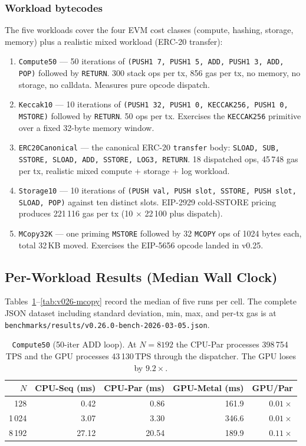 \subsubsection*{Workload bytecodes}

The five workloads cover the four EVM cost classes (compute, hashing,
storage, memory) plus a realistic mixed workload (ERC-20 transfer):

\begin{enumerate}
  \item \texttt{Compute50} --- 50 iterations of
    \texttt{(PUSH1 7, PUSH1 5, ADD, PUSH1 3, ADD, POP)} followed by
    \texttt{RETURN}. 300 stack ops per tx, 856 gas per tx, no memory,
    no storage, no calldata. Measures pure opcode dispatch.
  \item \texttt{Keccak10} --- 10 iterations of
    \texttt{(PUSH1 32, PUSH1 0, KECCAK256, PUSH1 0, MSTORE)} followed
    by \texttt{RETURN}. 50 ops per tx. Exercises the \texttt{KECCAK256}
    primitive over a fixed 32-byte memory window.
  \item \texttt{ERC20Canonical} --- the canonical ERC-20
    \texttt{transfer} body: \texttt{SLOAD, SUB, SSTORE, SLOAD, ADD,
    SSTORE, LOG3, RETURN}. 18 dispatched ops, 45\,748 gas per tx,
    realistic mixed compute + storage + log workload.
  \item \texttt{Storage10} --- 10 iterations of
    \texttt{(PUSH val, PUSH slot, SSTORE, PUSH slot, SLOAD, POP)}
    against ten distinct slots. EIP-2929 cold-SSTORE pricing produces
    221\,116 gas per tx (10 $\times$ 22\,100 plus dispatch).
  \item \texttt{MCopy32K} --- one priming \texttt{MSTORE} followed by
    32 \texttt{MCOPY} ops of 1024 bytes each, total 32\,KB moved.
    Exercises the EIP-5656 opcode landed in v0.25.
\end{enumerate}

\subsection{Per-Workload Results (Median Wall Clock)}
\label{sec:v026:results}

Tables~\ref{tab:v026-compute}--\ref{tab:v026-mcopy} record the median
of five runs per cell. The complete JSON dataset including standard
deviation, min, max, and per-tx gas is at
\texttt{benchmarks/results/v0.26.0-bench-2026-03-05.json}.

\begin{table}[h]
\centering
\small
\begin{tabular}{rrrrr}
\toprule
$N$ & CPU-Seq (ms) & CPU-Par (ms) & GPU-Metal (ms) & GPU/Par \\
\midrule
128    & 0.42  & 0.86  & 161.9 & $0.01\times$ \\
1\,024 & 3.07  & 3.30  & 346.6 & $0.01\times$ \\
8\,192 & 27.12 & 20.54 & 189.9 & $0.11\times$ \\
\bottomrule
\end{tabular}
\caption{\texttt{Compute50} (50-iter ADD loop). At $N=8192$ the CPU-Par
processes 398\,754\,TPS and the GPU processes 43\,130\,TPS through the
dispatcher. The GPU loses by $9.2\times$.}
\label{tab:v026-compute}
\end{table}

